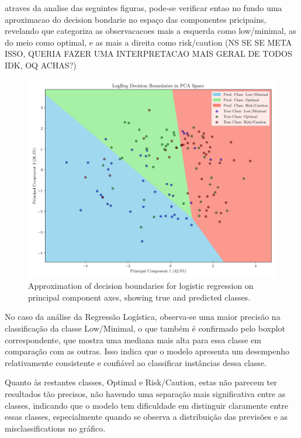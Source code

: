 \documentclass[conference]{IEEEtran}
\begin{document}
atraves da analise das seguintes figuras, pode-se verificar entao no fundo uma aproximacao do decision bondarie no espaço das componentes pricipains, revelando que categoriza as observacacoes mais a esquerda como low/minimal, as do meio como optimal, e as mais a direita como risk/caution (NS SE SE META ISSO, QUERIA FAZER UMA INTERPRETACAO MAIS GERAL DE TODOS IDK, OQ ACHAS?)

\begin{figure}[H]
    \centering
    \includegraphics[width=1\linewidth]{assets/pca_reglog.png}
    \caption{Approximation of decision boundaries for logistic regression on principal component axes, showing true and predicted classes.}
    \label{pca_reglog}
\end{figure}

No caso da análise da Regressão Logística, observa-se uma maior precisão na classificação da classe Low/Minimal, o que também é confirmado pelo boxplot correspondente, que mostra uma mediana mais alta para essa classe em comparação com as outras. Isso indica que o modelo apresenta um desempenho relativamente consistente e confiável ao classificar instâncias dessa classe. 

Quanto às restantes classes, Optimal e Risk/Caution, estas não parecem ter resultados tão precisos, não havendo uma separação mais significativa entre as classes, indicando que o modelo tem dificuldade em distinguir claramente entre essas classes, especialmente quando se observa a distribuição das previsões e as misclassifications no gráfico.
\end{document}
